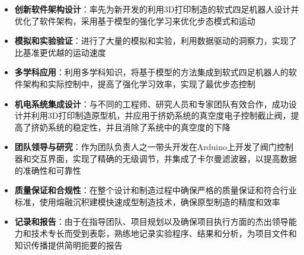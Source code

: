 




\begin{itemize}
\footnotesize 
  \item \textbf{创新软件架构设计}：率先为新开发的利用3D打印制造的软式四足机器人设计并优化了软件架构，采用基于模型的强化学习来优化步态模式和运动
  \item \textbf{模拟和实验验证}：进行了大量的模拟和实验，利用数据驱动的洞察力，实现了比基准更优越的运动速度
  \item \textbf{多学科应用}：利用多学科知识，将基于模型的方法集成到软式四足机器人的软件架构和实际控制中，提高了强化学习效率，实现了最优步态控制
\end{itemize}

\begin{itemize}
\footnotesize 
  \item \textbf{机电系统集成设计}：与不同的工程师、研究人员和专家团队有效合作，成功设计并利用3D打印制造原型机，并应用于挤奶系统的真空度电子控制截止阀，提高了挤奶系统的稳定性，并且消除了系统中的真空度的下降
  \item \textbf{团队领导与研究}：作为团队负责人之一带头开发在Arduino上开发了阀门控制器和交互界面，实现了精确的无级调节，并集成了卡尔曼滤波器，以提高数据的准确性和可靠性
  \item \textbf{质量保证和合规性}：在整个设计和制造过程中确保严格的质量保证和符合行业标准，使用熔融沉积建模快速成型制造技术，确保原型制造的精度和效率
  \item \textbf{记录和报告}：由于在指导团队、项目规划以及确保项目执行方面的杰出领导能力和技术专长而受到表彰，熟练地记录实验程序、结果和分析，为项目文件和知识传播提供简明扼要的报告

\end{itemize}


